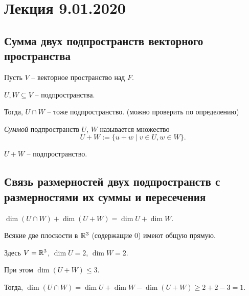 \section{Лекция 9.01.2020}

\subsection{Сумма двух подпространств векторного пространства}

Пусть $V$ -- векторное пространство над $F$.

$U, W \subseteq V$ -- подпространства.

Тогда, $U \cap W$ -- тоже подпространство. (можно проверить по определению)

\begin{definition}
    \textit{Суммой} подпространств $U$, $W$ называется множество
    \begin{equation*}
        U + W := \{u + w \mid v \in U, w \in W\}
    .\end{equation*}
\end{definition}

\begin{exercise}
    $U + W$ -- подпространство.
\end{exercise}

\begin{comment}
    Имеем $U \cap W \subseteq U = U + 0 \subseteq U + W$. 

    Значит,  $\dim (U \cap W) \leq \dim U \leq \dim (U + W)$.
\end{comment}


\subsection{Связь размерностей двух подпространств с размерностями их суммы и пересечения}

\begin{theorem}
    $\dim (U \cap W) + \dim (U + W) = \dim U + \dim W$.
\end{theorem}

\begin{example}
    Всякие две плоскости в $\mathbb{R}^3$ (содержащие 0) имеют общую прямую.

    Здесь $V = \mathbb{R}^3$, $\dim U = 2$, $\dim W = 2$.

    При этом $\dim (U + W) \leq 3$.

    Тогда, $\dim (U \cap W) = \dim U + \dim W - \dim (U + W) \geq 2 + 2 - 3 = 1$.
\end{example}

